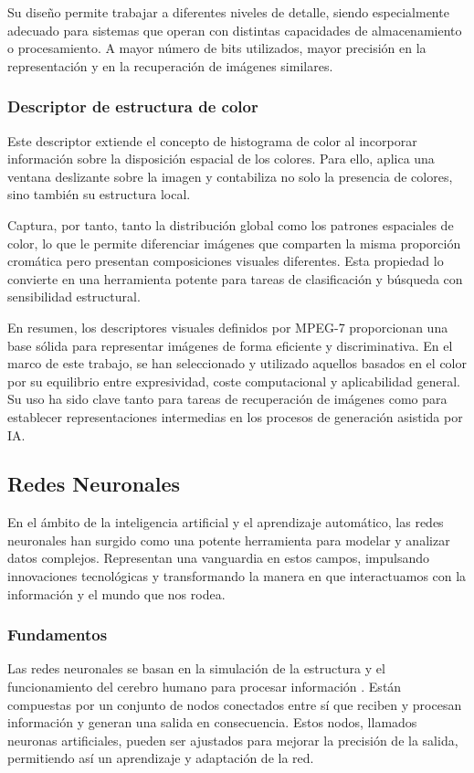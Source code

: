Su diseño permite trabajar a diferentes niveles de detalle, siendo especialmente adecuado para sistemas que operan con distintas capacidades de almacenamiento o procesamiento. A mayor número de bits utilizados, mayor precisión en la representación y en la recuperación de imágenes similares.

\subsubsection{Descriptor de estructura de color}

Este descriptor extiende el concepto de histograma de color al incorporar información sobre la disposición espacial de los colores. Para ello, aplica una ventana deslizante sobre la imagen y contabiliza no solo la presencia de colores, sino también su estructura local.

Captura, por tanto, tanto la distribución global como los patrones espaciales de color, lo que le permite diferenciar imágenes que comparten la misma proporción cromática pero presentan composiciones visuales diferentes. Esta propiedad lo convierte en una herramienta potente para tareas de clasificación y búsqueda con sensibilidad estructural.

\medskip

\noindent En resumen, los descriptores visuales definidos por MPEG-7 proporcionan una base sólida para representar imágenes de forma eficiente y discriminativa. En el marco de este trabajo, se han seleccionado y utilizado aquellos basados en el color por su equilibrio entre expresividad, coste computacional y aplicabilidad general. Su uso ha sido clave tanto para tareas de recuperación de imágenes como para establecer representaciones intermedias en los procesos de generación asistida por IA.

\subsection{Redes Neuronales}
En el ámbito de la inteligencia artificial y el aprendizaje automático, las redes neuronales han surgido como una potente herramienta para modelar y analizar datos complejos. Representan una vanguardia en estos campos, impulsando innovaciones tecnológicas y transformando la manera en que interactuamos con la información y el mundo que nos rodea.

\subsubsection{Fundamentos}
Las redes neuronales se basan en la simulación de la estructura y el funcionamiento del cerebro humano para procesar información \cite{redes-open}. Están compuestas por un conjunto de nodos conectados entre sí que reciben y procesan información y generan una salida en consecuencia. Estos nodos, llamados neuronas artificiales, pueden ser ajustados para mejorar la precisión de la salida, permitiendo así un aprendizaje y adaptación de la red.

